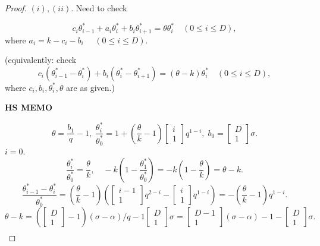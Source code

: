 \documentclass[
]{book}
\theoremstyle{definition}
\theoremstyle{definition}
\theoremstyle{definition}
\theoremstyle{definition}
\theoremstyle{remark}
\begin{document}
\begin{proof}
\leavevmode

\((i), (ii)\). Need to check

\[c_i\theta^*_{i-1} + a_i\theta^*_i + b_i\theta^*_{i+1} = \theta \theta^*_i \quad (0\leq i\leq D),\]
where \(a_i = k-c_i - b_i\) \(\quad (0\leq i \leq D)\).

(equivalently: check
\begin{equation}
c_i(\theta^*_{i-1}-\theta^*_i) + b_i(\theta^*_i -\theta^*_{i+1}) = (\theta-k) \theta^*_i \quad (0\leq i\leq D),\label{eq:cibithetak}
\end{equation}
where \(c_i, b_i, \theta^*_i, \theta\) are as given.)

\textbf{HS MEMO}

\[\theta = \frac{b_1}{q}-1, \; \frac{\theta^*_i}{\theta^*_0} = 1 + \left(\frac{\theta}{k}-1\right)\begin{bmatrix}{i}\\{1}\end{bmatrix} q^{1-i}, \; b_0 = \begin{bmatrix}{D}\\{1}\end{bmatrix}\sigma.\]
\(i=0\).
\[\frac{\theta^*_i}{\theta^*_0} = \frac{\theta}{k}, \quad - k\left(1-\frac{\theta^*_1}{\theta^*_0}\right)= -k(1-\frac{\theta}{k}) = \theta -k.\]
\[\frac{\theta^*_{i-1}-\theta^*_i}{\theta^*_0} = \left(\frac{\theta}{k}-1\right)\left(\begin{bmatrix}{i-1}\\{1}\end{bmatrix}q^{2-i}-\begin{bmatrix}{i}\\{1}\end{bmatrix}q^{1-i}\right)=-\left(\frac{\theta}{k}-1\right)q^{1-i}.\]
\[\theta-k=\left(\begin{bmatrix}{D}\\{1}\end{bmatrix}-1\right)(\sigma-\alpha)/q-1 \begin{bmatrix}{D}\\{1}\end{bmatrix}\sigma = \begin{bmatrix}{D-1}\\{1}\end{bmatrix}(\sigma-\alpha)-1-\begin{bmatrix}{D}\\{1}\end{bmatrix}\sigma.\]
\begin{align}

\end{align}
\end{proof}
\end{document}
